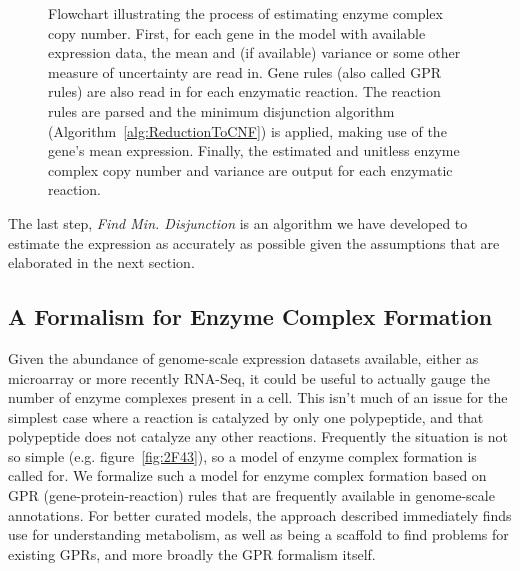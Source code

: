 \vspace{5 mm} 
\begin{figure}
\begin{center}
\end{center}
\caption{Flowchart illustrating the process of estimating enzyme
  complex copy number. First, for each gene in the model with
  available expression data, the mean and (if available) variance or
  some other measure of uncertainty are read in. Gene rules (also
  called GPR rules) are also read in for each enzymatic reaction. The
  reaction rules are parsed and the minimum disjunction algorithm
  (Algorithm~\ref{alg:ReductionToCNF}) is applied, making use of the
  gene's mean expression. Finally, the estimated and unitless enzyme
  complex copy number and variance are output for each enzymatic
  reaction.}
\label{ECCN_flowchart}
\end{figure}

The last step, \emph{Find Min. Disjunction} is an algorithm we have
developed to estimate the expression as accurately as possible given
the assumptions that are elaborated in the next section.

\subsection{A Formalism for Enzyme Complex Formation}

Given the abundance of genome-scale expression datasets available,
either as microarray or more recently RNA-Seq, it could be useful to
actually gauge the number of enzyme complexes present in a cell. This
isn't much of an issue for the simplest case where a reaction is
catalyzed by only one polypeptide, and that polypeptide does not
catalyze any other reactions.  Frequently the situation is not so
simple (e.g. figure~\ref{fig:2F43}), so a model of enzyme complex
formation is called for.  We formalize such a model for enzyme complex
formation based on GPR (gene-protein-reaction) rules that are
frequently available in genome-scale annotations. For better curated
models, the approach described immediately finds use for understanding
metabolism, as well as being a scaffold to find problems for existing
GPRs, and more broadly the GPR formalism itself.

